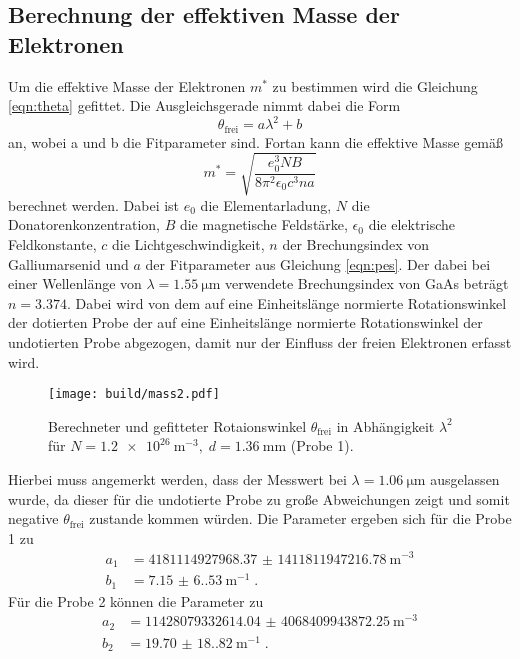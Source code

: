 \subsection{Berechnung der effektiven Masse der Elektronen}
Um die effektive Masse der Elektronen $m^*$ zu bestimmen wird die Gleichung \eqref{eqn:theta} gefittet.
Die Ausgleichsgerade nimmt dabei die Form 
\begin{equation}
    \theta_\text{frei} = a \lambda^2 + b \label{eqn:pes}
\end{equation}
an, wobei a und b die Fitparameter sind.
Fortan kann die effektive Masse gemäß
\begin{equation}
    m^* = \sqrt{\frac{e_0^3 NB }{8 \pi^2 \epsilon_0 c^3 na}} \label{eqn:mass}
\end{equation}
berechnet werden.
Dabei ist $e_0$ die Elementarladung, $N$ die Donatorenkonzentration, $B$ die magnetische Feldstärke, $\epsilon_0$ die elektrische Feldkonstante,
$c$ die Lichtgeschwindigkeit, $n$ der Brechungsindex von Galliumarsenid und $a$ der Fitparameter aus Gleichung \eqref{eqn:pes}.
Der dabei bei einer Wellenlänge von $\lambda = \qty{1.55}{\micro\metre}$ verwendete Brechungsindex von GaAs beträgt $n = 3.374$\cite{brechungsindex}.
Dabei wird von dem auf eine Einheitslänge normierte Rotationswinkel der dotierten Probe der auf eine Einheitslänge normierte Rotationswinkel der undotierten Probe abgezogen,
damit nur der Einfluss der freien Elektronen erfasst wird.
\begin{figure}
    \centering
    \texttt{[image: build/mass2.pdf]}
    \caption{Berechneter und gefitteter Rotaionswinkel $\theta_\text{frei}$ in Abhängigkeit $\lambda^2$ für $
    N=\qty{1.2e26}{\meter\tothe{-3}}, \; d = \qty{1,36}{\milli\meter}$ (Probe 1).}
    \label{fig:mass2}
\end{figure}
Hierbei muss angemerkt werden, dass der Messwert bei $\lambda = \qty{1.06}{\micro\metre}$ ausgelassen wurde, da dieser für die undotierte Probe zu große Abweichungen zeigt
und somit negative $ \theta_\text{frei}$ zustande kommen würden.
Die Parameter ergeben sich für die Probe 1 zu
\begin{align*}
    a_1 &= \qty{4181114927968.37(141181194721678)}{\metre\tothe{-3}} \\
    b_1 &= \qty{7.15(6.53)}{\metre\tothe{-1}} \; \text{.}
\end{align*}
Für die Probe 2 können die Parameter zu
\begin{align*}
    a_2 &= \qty{11428079332614.04(406840994387225)}{\metre\tothe{-3}} \\
    b_2 &= \qty{19.70(18.82)}{\metre\tothe{-1}} \; \text{.}
\end{align*}
